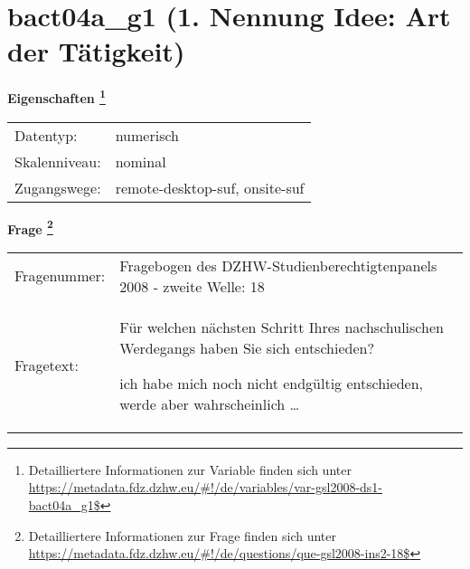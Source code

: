 
    \setcounter{footnote}{0}

    \vspace*{-1.8cm}
	\section{bact04a\_g1 (1. Nennung Idee: Art der Tätigkeit)}
	\label{section:bact04a_g1}



    \vspace*{0.5cm}
    \noindent\textbf{Eigenschaften
	\footnote{Detailliertere Informationen zur Variable finden sich unter
		\url{https://metadata.fdz.dzhw.eu/\#!/de/variables/var-gsl2008-ds1-bact04a_g1$}}}\\
	\begin{tabularx}{\hsize}{@{}lX}
	Datentyp: & numerisch \\
	Skalenniveau: & nominal \\
	Zugangswege: &
	  remote-desktop-suf, 
	  onsite-suf
 \\
    \end{tabularx}



				\vspace*{0.5cm}
                \noindent\textbf{Frage
	                \footnote{Detailliertere Informationen zur Frage finden sich unter
		              \url{https://metadata.fdz.dzhw.eu/\#!/de/questions/que-gsl2008-ins2-18$}}}\\
				\begin{tabularx}{\hsize}{@{}lX}
					Fragenummer: &
					  Fragebogen des DZHW-Studienberechtigtenpanels 2008 - zweite Welle:
					  18
 \\
					Fragetext: & Für welchen nächsten Schritt Ihres nachschulischen Werdegangs haben Sie sich entschieden?\par  ich habe mich noch nicht endgültig entschieden, werde aber wahrscheinlich … \\
				\end{tabularx}





